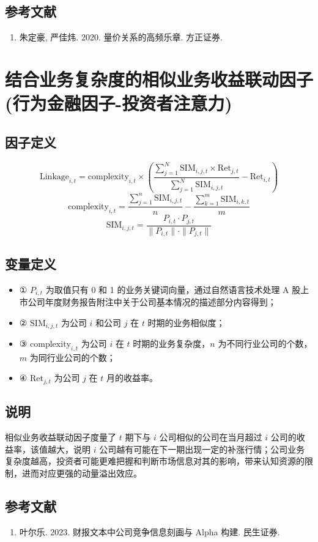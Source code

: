 \documentclass{article}
\begin{document}
\subsection{参考文献}
\begin{enumerate}
    \item 朱定豪, 严佳炜. 2020. 量价关系的高频乐章. 方正证券.
\end{enumerate}

\section{结合业务复杂度的相似业务收益联动因子(行为金融因子-投资者注意力)}

\subsection{因子定义}
\begin{equation}
    \mathrm{Linkage}_{i,t} = \mathrm{complexity}_{i,t} \times \left( \frac{\sum_{j=1}^{N} \mathrm{SIM}_{i,j,t} \times \mathrm{Ret}_{j,t}}{\sum_{j=1}^{N} \mathrm{SIM}_{i,j,t}} - \mathrm{Ret}_{i,t} \right)
\end{equation}
\begin{equation}
    \mathrm{complexity}_{i,t} = \frac{\sum_{j=1}^{n} \mathrm{SIM}_{i,j,t}}{n} - \frac{\sum_{k=1}^{m} \mathrm{SIM}_{i,k,t}}{m}
\end{equation}
\begin{equation}
    \mathrm{SIM}_{i,j,t} = \frac{P_{i,t} \cdot P_{j,t}}{\|P_{i,t}\| \cdot \|P_{j,t}\|}
\end{equation}

\subsection{变量定义}
\begin{itemize}
    \item ① \( P_{i,t} \) 为取值只有 0 和 1 的业务关键词向量，通过自然语言技术处理 A 股上市公司年度财务报告附注中关于公司基本情况的描述部分内容得到；
    \item ② \( \mathrm{SIM}_{i,j,t} \) 为公司 \( i \) 和公司 \( j \) 在 \( t \) 时期的业务相似度；
    \item ③ \( \mathrm{complexity}_{i,t} \) 为公司 \( i \) 在 \( t \) 时期的业务复杂度，\( n \) 为不同行业公司的个数，\( m \) 为同行业公司的个数；
    \item ④ \( \mathrm{Ret}_{j,t} \) 为公司 \( j \) 在 \( t \) 月的收益率。
\end{itemize}

\subsection{说明}
相似业务收益联动因子度量了 \( t \) 期下与 \( i \) 公司相似的公司在当月超过 \( i \) 公司的收益率，该值越大，说明 \( i \) 公司越有可能在下一期出现一定的补涨行情；公司业务复杂度越高，投资者可能更难把握和判断市场信息对其的影响，带来认知资源的限制，进而对应更强的动量溢出效应。

\subsection{参考文献}
\begin{enumerate}
    \item 叶尔乐. 2023. 财报文本中公司竞争信息刻画与 Alpha 构建. 民生证券.
\end{enumerate}
\end{document}
